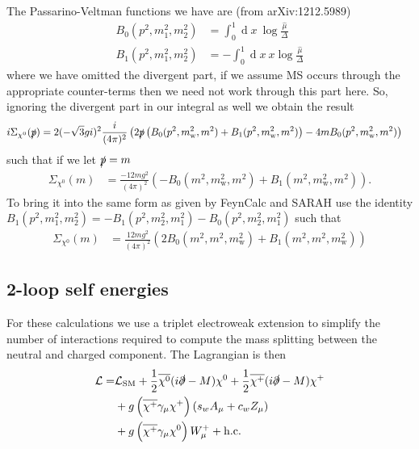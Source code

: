 \documentclass[11pt]{article}
\newcommand{\mychi}{\raisebox{0pt}[1ex][1ex]{$\chi$}}
\def\sp{\slashed{p}}
\def\cn{\chi^0}
\renewcommand{\d}{\ensuremath{\operatorname{d}\!}}
\begin{document}
The Passarino-Veltman functions we have are (from arXiv:1212.5989)
\begin{align}
B_0(p^2,m_1^2,m_2^2)&=\int_0^1\!\d x \ \log\frac{\hat{\mu}}{\Delta}\\
B_1(p^2,m_1^2,m_2^2)&=-\int_0^1\!\d x \ x\log\frac{\hat{\mu}}{\Delta}
\end{align}
where we have omitted the divergent part, if we assume MS occurs through the appropriate counter-terms then we need not work through this part here.  So, ignoring the divergent part in our integral as well we obtain the result
\begin{align}
i\Sigma_{\cn}(\slashed{p})&= 2(-\sqrt{3}gi)^2 \frac{i}{(4\pi)^2}  \left(2\sp\left( B_0(p^2,m_{\text{w}}^2,m^2)+B_1(p^2,m_{\text{w}}^2,m^2)\right)-4mB_0(p^2,m_{\text{w}}^2,m^2)\right)
\end{align}
such that if we let $\sp=m$
\begin{align}
\Sigma_{\cn}(m)&= \frac{-12mg^2}{(4\pi)^2}   \left( -B_0(m^2,m_{\text{w}}^2,m^2)+B_1(m^2,m_{\text{w}}^2,m^2)\right).
\end{align}
To bring it into the same form as given by FeynCalc and SARAH use the identity $B_1(p^2,m_1^2,m_2^2)=-B_1(p^2,m_2^2,m_1^2)-B_0(p^2,m_2^2,m_1^2)$ such that
\begin{align}
\Sigma_{\cn}(m)&= \frac{12mg^2}{(4\pi)^2}   \left( 2B_0(m^2,m^2,m_{\text{w}}^2)+B_1(m^2,m^2,m_{\text{w}}^2)\right)
\end{align}



\subsection{2-loop self energies}

For these calculations we use a triplet electroweak extension to simplify the number of interactions required to compute the mass splitting between the neutral and charged component.  The Lagrangian is then
\begin{align}
\begin{split}
\mathcal{L}=&\mathcal{L}_{\text{SM}}+\frac{1}{2}\overline{\mychi^0}(i\slashed{\partial}-M)\mychi^0+\frac{1}{2}\overline{\mychi^+}(i\slashed{\partial}-M)\mychi^{+}\\
&+g\left(\overline{\mychi^+}\gamma_{\mu}\mychi^+\right)\left(s_wA_{\mu}+c_wZ_{\mu}\right)\\
&+g\left(\overline{\mychi^+}\gamma_{\mu}\mychi^0 \right)W_{\mu}^++\text{h.c.}
\end{split}
\end{align}
\end{document}
